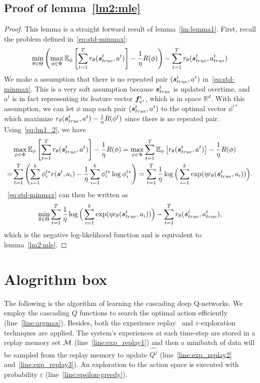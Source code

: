 \documentclass{article} %
\begin{document}
\subsection{Proof of lemma~\ref{lm2:mle}} 
\secondlemma*
\begin{proof}This lemma is a straight forward result of lemma~\ref{lm:lemma1}.
First, recall the problem defined in~\eqref{eq:std-minmax}:
\[
\min_{\theta \in \Theta} \left(\max_{\phi\in \Phi}  \mathbb{E}_{\phi} \left[\sum_{t=1}^Tr_{\theta}({\bm{s}}^t_{true}, a^t)\right] -\frac{1}{\eta}R(\phi)\right)-\sum_{t=1}^T r_{\theta}({\bm{s}}^t_{true}, a^t_{true})
	\]
We make a assumption that there is no repeated pair $({\bm{s}}^t_{true}, a^t)$ in~\eqref{eq:std-minmax}. This is a very soft assumption because ${\bm{s}}^t_{true}$ is updated overtime, and $a^t$ is in fact representing its feature vector ${\bm{f}}^t_{a^t}$, which is in space $\mathbb{R}^d$. With this assumption, we can let $\phi$ map each pair $({\bm{s}}^t_{true}, a^t)$ to the optimal vector $\phi^{t*}$  which maximize $r_{\theta}({\bm{s}}^t_{true}, a^t) -\frac{1}{\eta}R(\phi^t)$ since there is no repeated pair. Using~\eqref{eq:lm1_2}, we have
\begin{align*}
&\max_{\phi\in \Phi}  \mathbb{E}_{\phi} \left[\sum_{t=1}^Tr_{\theta}({\bm{s}}^t_{true}, a^t)\right] -\frac{1}{\eta}R(\phi) = \max_{\phi\in \Phi} \sum_{t=1}^T \mathbb{E}_{\phi} \left[r_{\theta}({\bm{s}}^t_{true}, a^t) \right]-\frac{1}{\eta}R(\phi) \\
    =& \sum_{t=1}^T\left(   \sum_{i=1}^k \phi_i^{t*}r({\bm{s}}^t, a_i) -\frac{1}{\eta} \sum_{i=1}^k \phi_i^{t*} \log \phi_i^{t*} \right)=\sum_{t=1}^T\frac{1}{\eta}\log\Big(\sum_{i=1}^k \exp(\eta r_{\theta}({\bm{s}}^t_{true}, a_i))\Big).
\end{align*}~\eqref{eq:std-minmax} can then be written as
\[
\min_{\theta\in\Theta}\sum_{t=1}^T\frac{1}{\eta}\log\Big(\sum_{i=1}^k \exp(\eta r_{\theta}({\bm{s}}^t_{true}, a_i))\Big) - \sum_{t=1}^T r_{\theta}({\bm{s}}^t_{true}, a^t_{true}),
\]
which is the negative log-likelihood function and is equivalent to lemma~\ref{lm2:mle}.
\end{proof}

\section{Alogrithm box}\label{app:algo}
The following is the algorithm of learning the cascading deep Q-networks. We employ the cascading $Q$ functions to search the optimal action efficiently (line~\ref{line:argmax}). Besides, both the experience replay~\citep{MniKavSilGraetal13} and $\varepsilon$-exploration techniques are applied. The system's experiences at each time-step are stored in a replay memory set ${\mathcal{M}}$ (line~\ref{line:exp_replay1}) and then a minibatch of data will be sampled from the replay memory to update $\widehat{Q^j}$ (line~\ref{line:exp_replay2} and~\ref{line:exp_replay3}). An exploration to the action space is executed with probability $\varepsilon$ (line~\ref{line:epsilon-greedy}).
\end{document}
